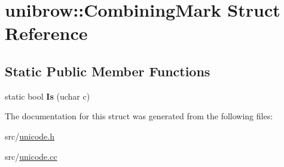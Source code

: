 \hypertarget{structunibrow_1_1_combining_mark}{}\section{unibrow\+:\+:Combining\+Mark Struct Reference}
\label{structunibrow_1_1_combining_mark}
\subsection*{Static Public Member Functions}
\begin{DoxyCompactItemize}
\item 
\hypertarget{structunibrow_1_1_combining_mark_a4b8f070f6e53e728a73c78801b338d2e}{}static bool {\bfseries Is} (uchar c)\label{structunibrow_1_1_combining_mark_a4b8f070f6e53e728a73c78801b338d2e}

\end{DoxyCompactItemize}


The documentation for this struct was generated from the following files\+:\begin{DoxyCompactItemize}
\item 
src/\hyperlink{unicode_8h}{unicode.\+h}\item 
src/\hyperlink{unicode_8cc}{unicode.\+cc}\end{DoxyCompactItemize}
